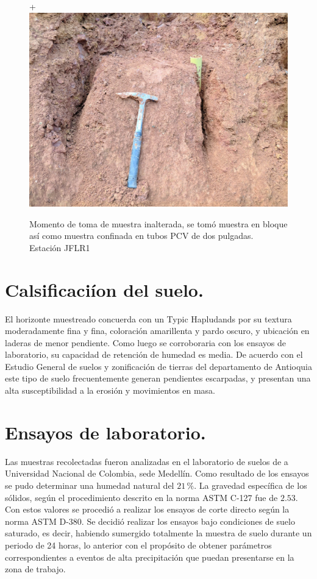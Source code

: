 \begin{figure}[H]+
\centering
\includegraphics[scale=0.20]{img/estacion11.jpg}
\caption{Momento de toma de muestra inalterada, se tom\'o muestra en bloque as\'i como muestra confinada en tubos PCV de dos pulgadas. Estaci\'on JFLR1 }
\label{fig:toma-bloque}
\end{figure}

\section{Calsificaci\'ion del suelo.}
El horizonte muestreado concuerda con un Typic Hapludands \cite{instituto2000estudio} por su textura moderadamente fina y fina, coloraci\'on  amarillenta y pardo oscuro, y ubicaci\'on en laderas de menor pendiente. Como luego se corroboraria con los ensayos de laboratorio, su capacidad de retenci\'on de humedad es media.
De acuerdo con el Estudio General de suelos y zonificaci\'on de tierras del departamento de Antioquia \cite{instituto2000estudio} este tipo de suelo frecuentemente generan pendientes escarpadas, y presentan una alta susceptibilidad a la erosi\'on y movimientos en masa.

\section{Ensayos de laboratorio.}
\label{ensayoslab}

Las muestras recolectadas fueron analizadas en el laboratorio de suelos de a Universidad Nacional de Colombia, sede Medell\'in.
Como resultado de los ensayos se pudo determinar una humedad natural del \(21\,\%\).
La gravedad espec\'ifica de los s\'olidos, seg\'un el procedimiento descrito en la norma ASTM C-127 fue de \(2.53\).
Con estos valores se procedi\'o a realizar los ensayos de corte directo seg\'un la norma ASTM D-380. Se decidi\'o realizar los ensayos bajo condiciones de suelo saturado, es decir, habiendo sumergido totalmente la muestra de suelo durante un periodo de 24 horas, lo anterior con el prop\'osito de obtener par\'ametros correspondientes a eventos de alta precipitaci\'on que puedan presentarse en la zona de trabajo.

